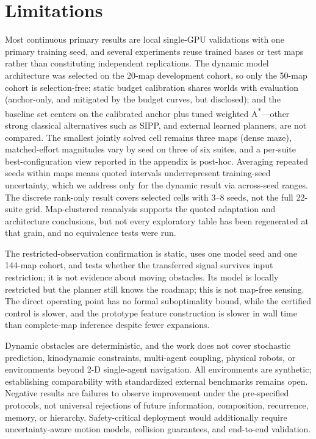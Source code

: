 \documentclass[letterpaper]{article} %
\begin{document}
\section{Limitations}

Most continuous primary results are local single-GPU validations with one primary training seed, and several experiments reuse trained bases or test maps rather than constituting independent replications. The dynamic model architecture was selected on the 20-map development cohort, so only the 50-map cohort is selection-free; static budget calibration shares worlds with evaluation (anchor-only, and mitigated by the budget curves, but disclosed); and the baseline set centers on the calibrated anchor plus tuned weighted A\textsuperscript{*}---other strong classical alternatives such as SIPP, and external learned planners, are not compared. The smallest jointly solved cell remains three maps (dense maze), matched-effort magnitudes vary by seed on three of six suites, and a per-suite best-configuration view reported in the appendix is post-hoc. Averaging repeated seeds within maps means quoted intervals underrepresent training-seed uncertainty, which we address only for the dynamic result via across-seed ranges. The discrete rank-only result covers selected cells with 3--8 seeds, not the full 22-suite grid. Map-clustered reanalysis supports the quoted adaptation and architecture conclusions, but not every exploratory table has been regenerated at that grain, and no equivalence tests were run.

The restricted-observation confirmation is static, uses one model seed and one 144-map cohort, and tests whether the transferred signal survives input restriction; it is not evidence about moving obstacles. Its model is locally restricted but the planner still knows the roadmap; this is not map-free sensing. The direct operating point has no formal suboptimality bound, while the certified control is slower, and the prototype feature construction is slower in wall time than complete-map inference despite fewer expansions.

Dynamic obstacles are deterministic, and the work does not cover stochastic prediction, kinodynamic constraints, multi-agent coupling, physical robots, or environments beyond 2-D single-agent navigation. All environments are synthetic; establishing comparability with standardized external benchmarks remains open. Negative results are failures to observe improvement under the pre-specified protocols, not universal rejections of future information, composition, recurrence, memory, or hierarchy. Safety-critical deployment would additionally require uncertainty-aware motion models, collision guarantees, and end-to-end validation.
\end{document}
